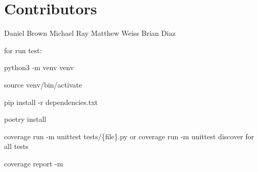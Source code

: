 \chapter{Contributors }
\hypertarget{md_README}{}\label{md_README}
\label{md_README_autotoc_md0}%
%


Daniel Brown Michael Ray Matthew Weiss Brian Diaz

for run test\+:


\begin{DoxyEnumerate}
\item python3 -\/m venv venv
\item source venv/bin/activate
\item pip install -\/r dependencies.\+txt
\item poetry install
\item coverage run -\/m unittest tests/\{file\}.py or coverage run -\/m unittest discover for all tests
\item coverage report -\/m 
\end{DoxyEnumerate}